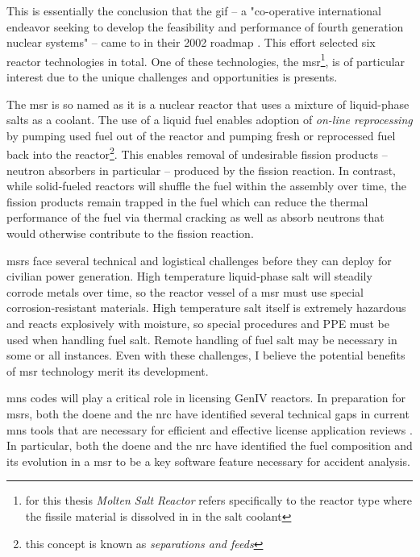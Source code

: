 This is essentially the conclusion that the \Gls{gif} -- a "co-operative international endeavor seeking to develop the feasibility and performance of fourth generation nuclear systems" \cite{gif_homepage} -- came to in their 2002 roadmap \cite{doe-ne_technology_2002}. This effort selected six reactor technologies in total. One of these technologies, the \Gls{msr}\footnote{for this thesis {\it Molten Salt Reactor} refers specifically to the reactor type where the fissile material is dissolved in in the salt
coolant}, is of particular interest due to the unique challenges and opportunities is presents.

The \Gls{msr} is so named as it is a nuclear reactor that uses a mixture of liquid-phase salts as a coolant. The use of a liquid fuel enables adoption of {\it on-line reprocessing} by pumping used fuel out of the reactor and pumping fresh or reprocessed fuel back into the reactor\footnote{this concept is known as {\it separations and feeds}}. This enables removal of undesirable fission products -- neutron absorbers in particular -- produced by the fission reaction. In contrast, while solid-fueled reactors will shuffle
    the fuel within the assembly over time, the fission products remain trapped in the fuel which can reduce the thermal performance of the fuel via thermal cracking as well as absorb neutrons that would otherwise contribute to the fission reaction. 

    \Gls{msr}s face several technical and logistical challenges before they can deploy for civilian power generation. High temperature liquid-phase salt will steadily corrode metals over time, so  the reactor vessel of a \Gls{msr} must use special corrosion-resistant materials. High temperature salt itself is extremely hazardous and reacts explosively with moisture, so special procedures and PPE must be used when handling fuel salt. Remote handling of fuel salt may be necessary in some or all instances. Even with these challenges, I believe the potential benefits of \Gls{msr} technology merit its development.

\Gls{mns} codes will play a critical role in licensing GenIV reactors. In preparation for \Gls{msr}s, both the \Gls{doene} and the \Gls{nrc} have identified several technical gaps in current \Gls{mns} tools that are necessary for efficient and effective license application reviews \cite{betzler_modeling_2019} \cite{usnrc_nonlwr_2020-1}. In particular, both the \Gls{doene} and the \Gls{nrc} have identified the fuel composition and its evolution in a \Gls{msr} to be a key
software feature necessary for accident analysis. 

